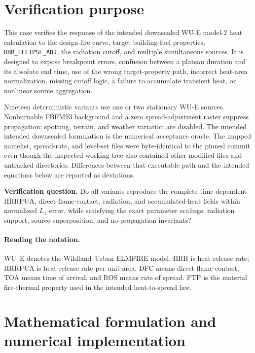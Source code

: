 \section{Verification purpose}

This case verifies the response of the intended downscaled WU-E model-2 heat
calculation to the design-fire curve, target building-fuel properties,
\texttt{HRR\_ELLIPSE\_ADJ}, the radiation cutoff, and multiple simultaneous
sources.  It is designed to expose breakpoint errors, confusion between a
plateau duration and its absolute end time, use of the wrong target-property
path, incorrect heat-area normalization, missing cutoff logic, a failure to
accumulate transient heat, or nonlinear source aggregation.

Nineteen deterministic variants use one or two stationary WU-E sources.
Nonburnable FBFM93 background and a zero spread-adjustment raster suppress
propagation; spotting, terrain, and weather variation are disabled.  The
intended intended downscaled formulation is the numerical acceptance oracle. The mapped
namelist, spread-rate, and level-set files were byte-identical to the pinned
commit even though the inspected working tree also contained other modified
files and untracked directories. Differences between that executable path and
the intended equations below are reported as deviations.

\textbf{Verification question.} Do all variants reproduce the complete
time-dependent HRRPUA, direct-flame-contact, radiation, and accumulated-heat
fields within \HeatMapTolerance{} normalized $L_1$ error, while satisfying
the exact parameter scalings, radiation support, source-superposition, and
no-propagation invariants?


\paragraph{Reading the notation.}
WU--E denotes the Wildland--Urban ELMFIRE model. HRR is heat-release rate;
HRRPUA is heat-release rate per unit area. DFC means direct flame contact,
TOA means time of arrival, and ROS means rate of spread. FTP is the material
fire-thermal property used in the intended heat-to-spread law.

\ReportOverview

\section{Mathematical formulation and numerical implementation}

